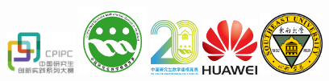 \documentclass[11pt]{article}
\begin{document}
\begin{center}

  \begin{figure}[H]
    \includegraphics[width=0.2\textwidth]{标题图1.png}
    \hspace{0mm}
    \includegraphics[width=0.2\textwidth]{标题图2.png}
    \hspace{3mm}
    \includegraphics[width=0.14\textwidth]{标题图3.png}
    \hspace{4mm}
    \includegraphics[width=0.16\textwidth]{标题图4.png}
    \hspace{4mm}
    \includegraphics[width=0.18\textwidth]{标题图5.png}
  \end{figure}
  \large{\xiaoerhao{}}\\
  \large{\erhao{}}\\
  \large{\erhao{}}
  \vspace{8em}


\end{center}
\end{document}
